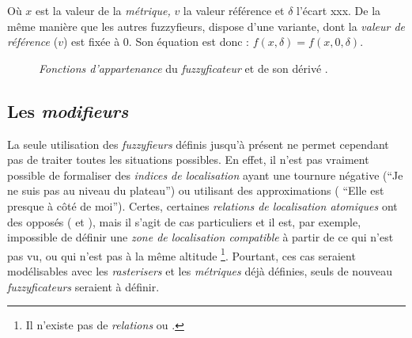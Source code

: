 Où \(x\) est la valeur de la \emph{métrique,} \(v\) la valeur
référence et \(\delta\) l'écart xxx. De la même manière que les autres
\textrm{fuzzyfieurs,}  dispose d'une variante,
 dont la \emph{valeur de référence} (\(v\)) est
fixée à 0. Son équation est donc : \(f(x,\delta) = f(x,0,\delta)\).

\begin{figure}
  \centering
  \hfill
  \caption{\emph{Fonctions d'appartenance} du \emph{fuzzyficateur}
    \protect{} et de son dérivé
    \protect{}.}
  \label{fig:select_infval}
\end{figure}

\subsection{Les \emph{modifieurs}}

La seule utilisation des \emph{fuzzyfieurs} définis jusqu'à présent ne
permet cependant pas de traiter toutes les situations possibles. En
effet, il n'est pas vraiment possible de formaliser des \emph{indices
  de localisation} ayant une tournure négative (\eg \enquote{Je ne
  suis pas au niveau du plateau}) ou utilisant des approximations (\eg
\enquote{Elle est presque à côté de moi}). Certes, certaines
\emph{relations de localisation atomiques} ont des opposés (\eg
{} et ), mais il s'agit de
cas particuliers et il est, par exemple, impossible de définir une
\emph{zone de localisation compatible} à partir de ce qui n'est pas
vu, ou qui n'est pas à la même altitude \footnote{Il n'existe pas de
  \emph{relations}  ou
  .}. Pourtant, ces cas
seraient modélisables avec les \emph{rasterisers} et les
\emph{métriques} déjà définies, seuls de nouveau \emph{fuzzyficateurs}
seraient à définir.

